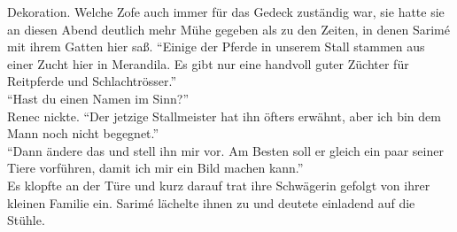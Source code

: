 Dekoration. Welche Zofe auch immer für das Gedeck zuständig war, sie hatte sie an diesen Abend 
deutlich mehr Mühe gegeben als zu den Zeiten, in denen Sarimé mit ihrem Gatten hier saß. 
``Einige der Pferde in unserem Stall stammen aus einer Zucht hier in Merandila. Es gibt nur eine 
handvoll guter Züchter für Reitpferde und Schlachtrösser.''\\
``Hast du einen Namen im Sinn?''\\
Renec nickte. ``Der jetzige Stallmeister hat ihn öfters erwähnt, aber ich bin dem Mann noch nicht 
begegnet.''\\
``Dann ändere das und stell ihn mir vor. Am Besten soll er gleich ein paar seiner Tiere vorführen, 
damit ich mir ein Bild machen kann.''\\
Es klopfte an der Türe und kurz darauf trat ihre Schwägerin gefolgt von ihrer kleinen Familie ein. 
Sarimé lächelte ihnen zu und deutete einladend auf die Stühle. \\


